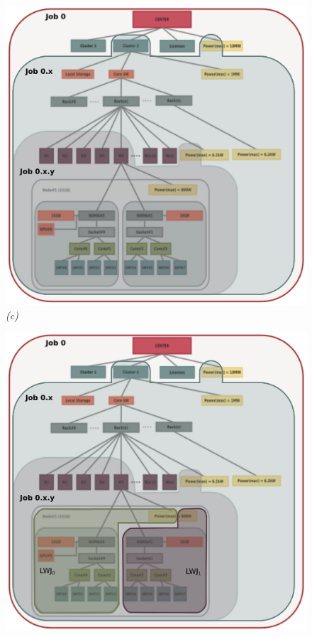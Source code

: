 \documentclass{article}
\begin{document}
\begin{figure}
\begin{minipage}{0.5\linewidth}
  \begin{center}
  \includegraphics[scale=0.45]{../fig/job-hierarchy-job0.x.y.eps}
  {\em (c)}
  \end{center}
\end{minipage}
\begin{minipage}{0.5\linewidth}
  \begin{center}
  \includegraphics[scale=0.45]{../fig/job-hierarchy-lwj.eps}

\end{center}
\end{minipage}
\end{figure}
\end{document}
